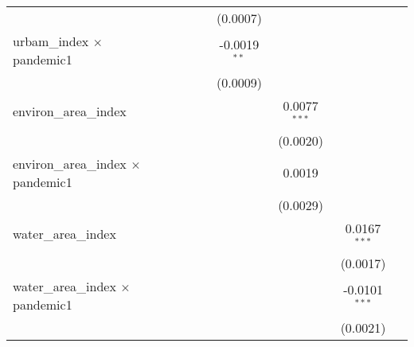 \begin{table}[htbp]
\begin{tabular}{lccccccc}
                                                 &                         &                         &                         & (0.0007)                &                &                 &   \\   
      urbam\_index $\times$ pandemic1            &                         &                         &                         & -0.0019$^{**}$          &                &                 &   \\   
                                                 &                         &                         &                         & (0.0009)                &                &                 &   \\   
      environ\_area\_index                       &                         &                         &                         &                         & 0.0077$^{***}$ &                 &   \\   
                                                 &                         &                         &                         &                         & (0.0020)       &                 &   \\   
      environ\_area\_index $\times$ pandemic1    &                         &                         &                         &                         & 0.0019         &                 &   \\   
                                                 &                         &                         &                         &                         & (0.0029)       &                 &   \\   
      water\_area\_index                         &                         &                         &                         &                         &                & 0.0167$^{***}$  &   \\   
                                                 &                         &                         &                         &                         &                & (0.0017)        &   \\   
      water\_area\_index $\times$ pandemic1      &                         &                         &                         &                         &                & -0.0101$^{***}$ &   \\   
                                                 &                         &                         &                         &                         &                & (0.0021)        &   \\   

\end{tabular}
\end{table}

